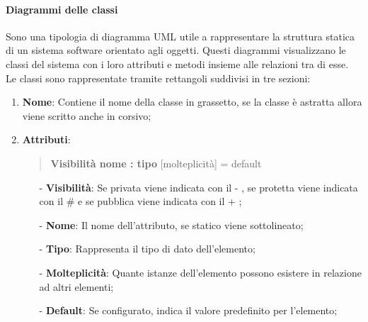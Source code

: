 \documentclass[10pt]{article}
\begin{document}
\begin{justify}
        \paragraph{Diagrammi delle classi}
        Sono una tipologia di diagramma UML utile a rappresentare la struttura statica di un sistema software orientato agli oggetti. Questi diagrammi visualizzano le classi del sistema con i loro attributi e metodi insieme alle relazioni tra di esse.\\
        Le classi sono rappresentate tramite rettangoli suddivisi in tre sezioni: 
        \begin{enumerate}
            \item \textbf{Nome}: Contiene il nome della classe in grassetto, se la classe è astratta allora viene scritto anche in corsivo;
            \item \textbf{Attributi}:
            \begin{quote}
                \textbf{Visibilità nome : tipo} [molteplicità] = default
            \end{quote}
            \begin{itemize}
                \item [-] \textbf{Visibilità}: Se privata viene indicata con il - , se protetta viene indicata con il \# e se pubblica viene indicata con il + ;
                \item [-] \textbf{Nome}: Il nome dell’attributo, se statico viene sottolineato;
                \item [-] \textbf{Tipo}: Rappresenta il tipo di dato dell’elemento;
                \item [-] \textbf{Molteplicità}: Quante istanze dell’elemento possono esistere in relazione ad altri elementi;
                \item [-] \textbf{Default}: Se configurato, indica il valore predefinito per l’elemento;
            \end{itemize}
        

\end{enumerate}
\end{justify}
\end{document}
